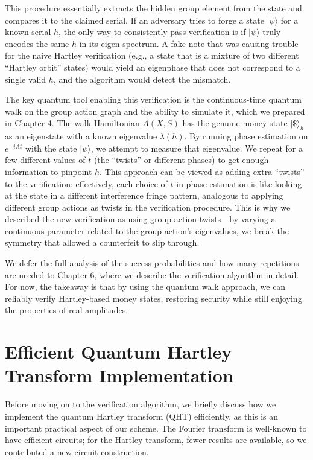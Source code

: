\documentclass[12pt]{report}
\begin{document}
This procedure essentially extracts the hidden group element from the state and compares it to the claimed serial. If an adversary tries to forge a state $|\psi\rangle$ for a known serial $h$, the only way to consistently pass verification is if $|\psi\rangle$ truly encodes the same $h$ in its eigen-spectrum. A fake note that was causing trouble for the naive Hartley verification (e.g., a state that is a mixture of two different “Hartley orbit” states) would yield an eigenphase that does not correspond to a single valid $h$, and the algorithm would detect the mismatch.

The key quantum tool enabling this verification is the continuous-time quantum walk on the group action graph and the ability to simulate it, which we prepared in Chapter 4. The walk Hamiltonian $A(X,S)$ has the genuine money state $|\$\rangle_h$ as an eigenstate with a known eigenvalue $\lambda(h)$. By running phase estimation on $e^{-iA t}$ with the state $|\psi\rangle$, we attempt to measure that eigenvalue. We repeat for a few different values of $t$ (the “twists” or different phases) to get enough information to pinpoint $h$. This approach can be viewed as adding extra “twists” to the verification: effectively, each choice of $t$ in phase estimation is like looking at the state in a different interference fringe pattern, analogous to applying different group actions as twists in the verification procedure. This is why we described the new verification as using group action twists—by varying a continuous parameter related to the group action’s eigenvalues, we break the symmetry that allowed a counterfeit to slip through.

We defer the full analysis of the success probabilities and how many repetitions are needed to Chapter 6, where we describe the verification algorithm in detail. For now, the takeaway is that by using the quantum walk approach, we can reliably verify Hartley-based money states, restoring security while still enjoying the properties of real amplitudes.

\section{Efficient Quantum Hartley Transform Implementation}
Before moving on to the verification algorithm, we briefly discuss how we implement the quantum Hartley transform (QHT) efficiently, as this is an important practical aspect of our scheme. The Fourier transform is well-known to have efficient circuits; for the Hartley transform, fewer results are available, so we contributed a new circuit construction.
\end{document}
